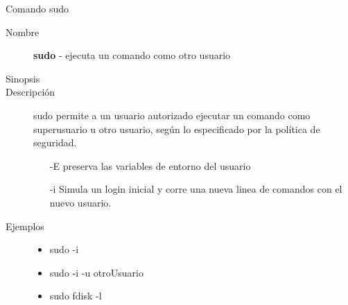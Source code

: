 \begin{frame}[c]{Comando sudo}
  \begin{description}
    \item[Nombre]
      \textbf{sudo} - ejecuta un comando como otro usuario

    \vspace{\baselineskip}
    \item[Sinopsis]

    \vspace{\baselineskip}
    \item[Descripción]
      sudo permite a un usuario autorizado ejecutar un comando como
      superusuario u otro usuario, según lo especificado por la política de
      seguridad.

      \begin{itemize}
        \item [-E] preserva las variables de entorno del usuario
        \item [-i] Simula un login inicial y corre una nueva linea de
          comandos con el nuevo usuario.
      \end{itemize}

    \vspace{\baselineskip}
    \item[Ejemplos]
      \begin{itemize}
        \item sudo -i
        \item sudo -i -u otroUsuario
        \item sudo fdisk -l
      \end{itemize}
  \end{description}
\end{frame}

